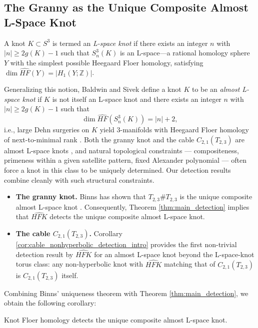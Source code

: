 \subsection{The Granny as the Unique Composite Almost L-Space Knot}

A knot $K \subset S^3$ is termed an \textit{L-space knot} if there exists an integer $n$ with $|n| \geq 2g(K) - 1$ such that $S^3_n(K)$ is an L-space---a rational homology sphere $Y$ with the simplest possible Heegaard Floer homology, satisfying $\dim \widehat{HF}(Y) = |H_1(Y; \mathbb{Z})|$. 

Generalizing this notion, Baldwin and Sivek define a knot $K$ to be an \textit{almost L-space knot} if $K$ is not itself an L-space knot and there exists an integer $n$ with $|n| \geq 2g(K) - 1$ such that
\[
\dim \widehat{HF}(S^3_n(K)) = |n| + 2,
\]
i.e., large Dehn surgeries on $K$ yield 3-manifolds with Heegaard Floer homology of next-to-minimal rank \cite{BaldwinSivek2024}. Both the granny knot and the cable $C_{2,1}(T_{2,3})$ are almost L-space knots \cite{Binns2023}, and natural topological constraints --- compositeness, primeness within a given satellite pattern, fixed Alexander polynomial --- often force a knot in this class to be uniquely determined. Our detection results combine cleanly with such structural constraints.

\begin{itemize}
    \item \textbf{The granny knot.} Binns has shown that $T_{2,3} \# T_{2,3}$ is the unique composite almost L-space knot \cite{Binns2023}. Consequently, Theorem \ref{thm:main_detection} implies that $\widehat{HFK}$ detects the unique composite almost L-space knot.
    
    \item \textbf{The cable $C_{2,1}(T_{2,3})$.} Corollary \ref{cor:cable_nonhyperbolic_detection_intro} provides the first non-trivial detection result by $\widehat{HFK}$ for an almost L-space knot beyond the L-space-knot torus class: any non-hyperbolic knot with $\widehat{HFK}$ matching that of $C_{2,1}(T_{2,3})$ is $C_{2,1}(T_{2,3})$ itself.
\end{itemize}

Combining Binns' uniqueness theorem with Theorem \ref{thm:main_detection}, we obtain the following corollary:

\begin{corollary}\label{cor:detect_unique_composite_almost_lspace}
Knot Floer homology detects the unique composite almost L-space knot.
\end{corollary}

